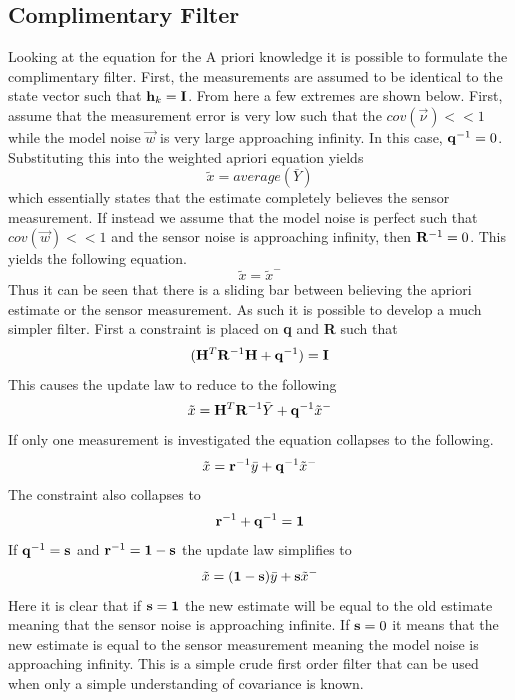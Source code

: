 \documentclass{article}
\begin{document}
\subsection{Complimentary Filter}

Looking at the equation for the A priori knowledge it is possible to
formulate the complimentary filter. First, the measurements are
assumed to be identical to the state vector such that ${\bf h}_k = {\bf
  I}$. From here a few extremes are shown below. First, assume that the measurement error is very low such
that the $cov(\vec{\nu})<<1$ while the model noise $\vec{w}$ is very
large approaching infinity. In this case, ${\bf q}^{-1} =0$. Substituting this into the weighted apriori equation yields
\begin{equation}
  \tilde{x} = average(\bar{Y})
\end{equation}
which essentially states that the estimate completely believes the
sensor measurement. If instead we assume that the model noise is
perfect such that $cov(\vec{w})<<1$ and the sensor noise is
approaching infinity, then ${\bf R}^{-1}=0$. This yields the following equation.
\begin{equation}
  \tilde{x} = \tilde{x}^{-}
\end{equation}
Thus it can be seen that there is a sliding bar between believing the
apriori estimate or the sensor measurement. As such it is possible to
develop a much simpler filter. First a constraint is placed on {\bf q}
and {\bf R} such that
\begin{equation}
  ({\bf H}^T{\bf R}^{-1}{\bf H}+{\bf q}^{-1}) = {\bf I}
\end{equation}
This causes the update law to reduce to the following
\begin{equation}
  \tilde{x} = {\bf H}^T{\bf R}^{-1}\bar{Y}+{\bf q}^{-1}\tilde{x}^{-}
\end{equation}
If only one measurement is investigated the equation collapses to the
following.
\begin{equation}
  \tilde{x} = {\bf r}^{-1}\bar{y}+{\bf q}^{-1}\tilde{x}^{-}
\end{equation}
The constraint also collapses to
\begin{equation}
  {\bf r}^{-1}+{\bf q}^{-1} = {\bf 1}
\end{equation}
If ${\bf q}^{-1} = {\bf s}$ and ${\bf r}^{-1}={\bf 1}-{\bf s}$ the
update law simplifies to
\begin{equation}
  \tilde{x} = ({\bf 1}-{\bf s})\bar{y}+{\bf s}\tilde{x}^{-}
\end{equation}
Here it is clear that if ${\bf s} = {\bf 1}$ the new estimate will be
equal to the old estimate meaning that the sensor noise is approaching
infinite. If ${\bf s} = 0$ it means that the new estimate is equal to
the sensor measurement meaning the model noise is approaching
infinity. This is a simple crude first order filter that can be used
when only a simple understanding of covariance is known.
\end{document}
